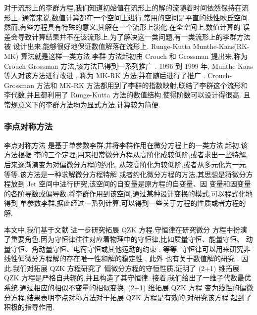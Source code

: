 对于流形上的李群方程,我们知道初始值在流形上的解的流随着时间依然保持在流形上.
通常来说,数值计算都在一个空间上进行,常用的空间是平直的线性欧氏空间.
然而,有些方程具有特殊的意义,其解在一个流形上演化.在全空间上,数值计算的
误差会导致计算结果并不在该流形上.为了解决这一类问题,有一类流形上的李群方法被
设计出来,能够很好地保证数值解落在流形上. Runge-Kutta Munthe-Kaas(RK-MK) 算法就是这样一类方法.李群
方法起初由 Crouch 和 Grossman \cite{crouch1993numerical} 提出来,称为 Crouch-Grossman 方法,该方法已得到一系列推广
\cite{faleinsen2001multi,zaletkin2010numerical,bulychev2001numerical,buono2003numerical,billo1992numerical}.
1996 到 1999 年, Munthe-Kaas 等人对该方法进行改进
\cite{mk1996lie,mk1997numerical,mk1998runge,mk1999high}, 称为 MK-RK 方法,并在随后进行了推广 \cite{ostermann2010exponential,owren2000the,bruls2012lie,munthe2013onpost,garcla2011onalg}.
Crouch-Grossman 方法和 MK-RK 方法都用到了李群的指数映射,联结了李群这个流形和
李代数,并且都利用了 Runge-Kutta 方法的数值结构,使得阶数可以设计得很高.
且常规意义下的李群方法均为显式方法,计算较为简便.

\subsubsection*{\textbf{李点对称方法}}

李点对称方法 \cite{olver2000app} 是基于单参数李群,并将李群作用在微分方程上的一类方法.起初,该方法根据
李的三个定理,用来把常微分方程从高阶化成较低阶,或者求出一些特解,后来逐渐演变为对偏微分方程的约化,
从较高阶化为较低阶,或者从多元化为一元,等等.该方法是一种求解微分方程特解
或者约化微分方程的方法,其思想是将微分方程放到 Jet 空间中进行研究,该空间的自变量是原方程的自变量、因
变量和因变量的各阶导数或偏导数.将李群作用到该空间,通过某种设计变换的模式,可以程式化地得到
单参数李群,据此经过一系列计算,可以得到一些关于方程的性质或者方程的解.

本文中,我们基于文献 \cite{sjoberg2007dou} 进一步研究拓展 QZK 方程.守恒律在研究微分
方程中扮演了重要角色,因为守恒律往往对应着物理中的守恒律,比如质量守恒、能量守恒、
动量守恒、角动量守恒、电荷守恒或其他运动的约束 \cite{mushtaq2005non,song2013top,song2013dom}, 等等.
守恒律可以用来研究非线性偏微分方程解的存在唯一性和解的稳定性 \cite{wang2014soli}, 此外
也有关于数值解的研究 \cite{wazwaz2005exact,wazwaz2008the}. 因此,我们对拓展 QZK 方程研究了
偏微分方程的守恒性质,证明了 (2+1) 维拓展 QZK 方程是严格自共轭的,并且构造了其守恒律.
接着,我们给出了一维子代数最优系统.通过相应的相似不变量的相似变换, (2+1) 维拓展 QZK 方程
变为线性的偏微分方程,结果表明李点对称方法对于拓展 QZK 方程是有效的,对研究该方程
起到了积极的指导作用.

